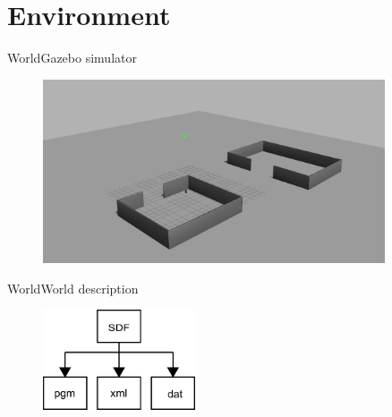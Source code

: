 \section{Environment}

\begin{frame}{World}{Gazebo simulator}

\begin{figure}
\centering
\includegraphics[width = 0.9\textwidth]{./screenshot/Gazebo.png}
\end{figure}

\end{frame}

\begin{frame}{World}{World description}

\begin{figure}
\centering
\includegraphics[width = 0.4\textwidth]{./figure/world_conversion.pdf}
\end{figure}

\end{frame}